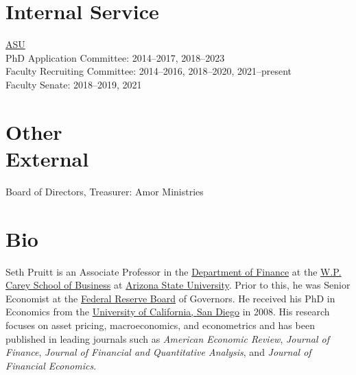 \documentclass[margin,line,12pt]{res}
\begin{document}
\begin{resume}
\section{\sc\small Internal Service}
\underline{ASU}\\
PhD Application Committee: 2014--2017, 2018--2023\\
Faculty Recruiting Committee: 2014--2016, 2018--2020, 2021--present\\
Faculty Senate: 2018--2019, 2021\\

\section{\sc\small Other\\ External}
Board of Directors, Treasurer: Amor Ministries

\section{\sc\small Bio}
Seth Pruitt is an Associate Professor in the \href{https://wpcarey.asu.edu/finance-degrees}{Department of Finance} at the \href{https://wpcarey.asu.edu/}{W.P. Carey School of Business} at \href{https://www.asu.edu/}{Arizona State University}. Prior to this, he was Senior Economist at the \href{https://www.federalreserve.gov/}{Federal Reserve Board} of Governors. He received his PhD in Economics from the \href{https://economics.ucsd.edu/}{University of California, San Diego} in 2008. His research focuses on asset pricing, macroeconomics, and econometrics and has been published in leading journals such as \emph{American Economic Review}, \emph{Journal of Finance}, \emph{Journal of Financial and Quantitative Analysis}, and \emph{Journal of Financial Economics}.


\end{resume}
\end{document}
